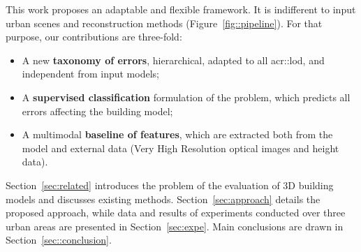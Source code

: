\documentclass[conference]{IEEEtran}
\begin{document}
     This work proposes an adaptable and flexible framework. It is indifferent to input urban scenes and reconstruction methods (Figure~\ref{fig::pipeline}). For that purpose, our contributions are three-fold:
    \begin{itemize}
        \item A new \textbf{taxonomy of errors}, hierarchical, adapted to all \acrshort{acr::lod}, and independent from input models;
        \item A \textbf{supervised classification} formulation of the problem, which predicts all errors affecting the building model;
        \item A multimodal \textbf{baseline of features}, which are extracted both from the model and external data (Very High Resolution optical images and height data).
    \end{itemize}

Section~\ref{sec:related} introduces the problem of the evaluation of 3D building models and discusses existing methods. Section~\ref{sec:approach} details the proposed approach, while data and results of experiments conducted over three urban areas are presented in Section~\ref{sec:expe}. Main conclusions are drawn in Section~\ref{sec::conclusion}.
\end{document}
